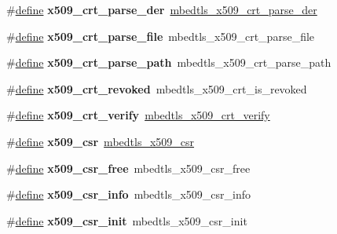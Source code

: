 \begin{DoxyCompactItemize}
\#\hyperlink{structdefine}{define} {\bfseries x509\+\_\+crt\+\_\+parse\+\_\+der}~\hyperlink{group__x509__module_ga003c2483a2691e025641fa9d68d4a96a}{mbedtls\+\_\+x509\+\_\+crt\+\_\+parse\+\_\+der}
\item 
\mbox{\label{compat-1_83_8h_ae51b0df56737d6c1d5493565db2331a9}} 
\#\hyperlink{structdefine}{define} {\bfseries x509\+\_\+crt\+\_\+parse\+\_\+file}~mbedtls\+\_\+x509\+\_\+crt\+\_\+parse\+\_\+file
\item 
\mbox{\label{compat-1_83_8h_a593df382b3b659eef72c7669fab8aed1}} 
\#\hyperlink{structdefine}{define} {\bfseries x509\+\_\+crt\+\_\+parse\+\_\+path}~mbedtls\+\_\+x509\+\_\+crt\+\_\+parse\+\_\+path
\item 
\mbox{\label{compat-1_83_8h_a05369ac40d74b6da67bf08bb320fc938}} 
\#\hyperlink{structdefine}{define} {\bfseries x509\+\_\+crt\+\_\+revoked}~mbedtls\+\_\+x509\+\_\+crt\+\_\+is\+\_\+revoked
\item 
\mbox{\label{compat-1_83_8h_a94ca4daf44f5bffbf4681b0fe3cc2f9a}} 
\#\hyperlink{structdefine}{define} {\bfseries x509\+\_\+crt\+\_\+verify}~\hyperlink{group__x509__module_ga98ed4504e4f832b735a230acf54fcde3}{mbedtls\+\_\+x509\+\_\+crt\+\_\+verify}
\item 
\mbox{\label{compat-1_83_8h_ae0cd50d723883f9488d700930897f2c9}} 
\#\hyperlink{structdefine}{define} {\bfseries x509\+\_\+csr}~\hyperlink{structmbedtls__x509__csr}{mbedtls\+\_\+x509\+\_\+csr}
\item 
\mbox{\label{compat-1_83_8h_abc81b4184da66fe8364a90de66be9c0d}} 
\#\hyperlink{structdefine}{define} {\bfseries x509\+\_\+csr\+\_\+free}~mbedtls\+\_\+x509\+\_\+csr\+\_\+free
\item 
\mbox{\label{compat-1_83_8h_a70bb542a38182e2d4f42b33e7ccbaac3}} 
\#\hyperlink{structdefine}{define} {\bfseries x509\+\_\+csr\+\_\+info}~mbedtls\+\_\+x509\+\_\+csr\+\_\+info
\item 
\mbox{\label{compat-1_83_8h_a7c8ac4263a9dbcac7e2c0d0b5dc6daca}} 
\#\hyperlink{structdefine}{define} {\bfseries x509\+\_\+csr\+\_\+init}~mbedtls\+\_\+x509\+\_\+csr\+\_\+init

\end{DoxyCompactItemize}
